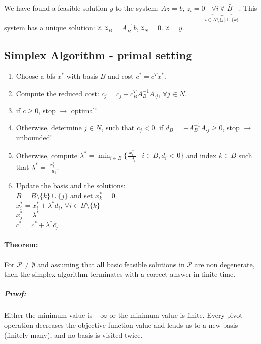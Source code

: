 \documentclass[main]{subfiles}
\begin{document}
We have found a feasible solution $y$ to the system: $Az = b$, $z_i = 0
\underbrace{\forall i \notin \bar{B}}_{i \in N \setminus \{j\} \cup \{k\}}$.
This system has a unique solution: $\hat{z}$. $\hat{z}_B = A^{-1}_{\bar{B}} b$,
$\hat{z}_N = 0$. $\hat{z} = y$.

\subsection{Simplex Algorithm - primal setting}
\begin{enumerate}
\item Choose a bfs $x^*$ with basis $B$ and cost $c^* = c^T x^*$.
\item Compute the reduced cost: $\bar{c_j} = c_j - c^T_B A^{-1}_B A_{\cdot j}$,
$\forall j \in N$.
\item if $\bar{c} \geq 0$, stop $\rightarrow$ optimal!
\item Otherwise, determine $j \in N$, such that $\bar{c_j} < 0$.
\subitem if $d_B = - A^{-1}_B A_{\cdot j} \geq 0$, stop $\rightarrow$ unbounded!
\item Otherwise, compute $\lambda^* = \min_{i \in B} \{\frac{x^*_i}{-d_i}
\mid i \in B, d_i < 0 \}$ and index $k \in B$ such that $\lambda^* =
\frac{x^*_k}{-d_k}$.
\item Update the basis and the solutions:\\
$B = B\setminus \{k\} \cup \{j\}$ and set $x^*_k = 0$\\
$x^*_i = x^*_i + \lambda^* d_i$, $\forall i \in B\setminus \{k\}$\\
$x^*_j = \lambda^*$\\
$c^* = c^* + \lambda^* \bar{c_j}$
\end{enumerate}

\paragraph{Theorem:} For $\mathcal{P} \neq \emptyset$ and assuming that all
basic feasible solutions in $\mathcal{P}$ are non degenerate, then the simplex
algorithm terminates with a correct answer in finite time.
\subparagraph{Proof:}
Either the minimum value is $-\infty$ or the minimum value is finite.
Every pivot operation decreases the objective function value and leads us to a
new basis (finitely many), and no basis is visited twice.
\end{document}
